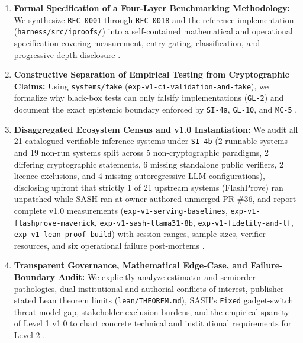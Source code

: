 \documentclass[11pt,letterpaper]{article}
\begin{document}
\begin{enumerate}
\item \textbf{Formal Specification of a Four-Layer Benchmarking Methodology:} We synthesize \texttt{RFC-0001} through \texttt{RFC-0018} and the reference implementation (\texttt{harness/\allowbreak{}src/\allowbreak{}iproofs/}) into a self-contained mathematical and operational specification covering measurement, entry gating, classification, and progressive-depth disclosure \cite{iproofs2026}.
\item \textbf{Constructive Separation of Empirical Testing from Cryptographic Claims:} Using \texttt{systems/\allowbreak{}fake} (\texttt{exp-\allowbreak{}v1-\allowbreak{}ci-\allowbreak{}validation-\allowbreak{}and-\allowbreak{}fake}), we formalize why black-box tests can only falsify implementations (\texttt{GL-2}) and document the exact epistemic boundary enforced by \texttt{SI-4a}, \texttt{GL-10}, and \texttt{MC-5} \cite{iproofs2026}.
\item \textbf{Disaggregated Ecosystem Census and v1.0 Instantiation:} We audit all 21 catalogued verifiable-inference systems under \texttt{SI-4b} (2 runnable systems and 19 non-run systems split across 5 non-cryptographic paradigms, 2 differing cryptographic statements, 6 missing standalone public verifiers, 2 licence exclusions, and 4 missing autoregressive LLM configurations), disclosing upfront that strictly 1 of 21 upstream systems (FlashProve) ran unpatched while SASH ran at owner-authored unmerged PR \#36, and report complete v1.0 measurements (\texttt{exp-\allowbreak{}v1-\allowbreak{}serving-\allowbreak{}baselines}, \texttt{exp-\allowbreak{}v1-\allowbreak{}flashprove-\allowbreak{}maverick}, \texttt{exp-\allowbreak{}v1-\allowbreak{}sash-\allowbreak{}llama31-8b}, \texttt{exp-\allowbreak{}v1-\allowbreak{}fidelity-\allowbreak{}and-\allowbreak{}tf}, \texttt{exp-\allowbreak{}v1-\allowbreak{}lean-\allowbreak{}proof-\allowbreak{}build}) with session ranges, sample sizes, verifier resources, and six operational failure post-mortems \cite{iproofs2026}.
\item \textbf{Transparent Governance, Mathematical Edge-Case, and Failure-Boundary Audit:} We explicitly analyze estimator and semiorder pathologies, dual institutional and authorial conflicts of interest, publisher-stated Lean theorem limits (\texttt{lean/\allowbreak{}THEOREM.\allowbreak{}md}), SASH's \texttt{Fixed} gadget-switch threat-model gap, stakeholder exclusion burdens, and the empirical sparsity of Level 1 v1.0 to chart concrete technical and institutional requirements for Level 2 \cite{iproofs2026,rinberg2026flashprove,sash2026}.
\end{enumerate}
\end{document}
